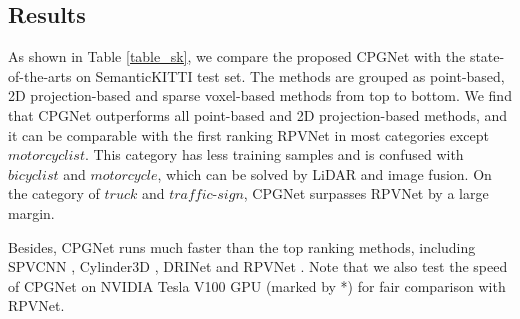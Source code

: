 \documentclass[letterpaper, 10 pt, conference]{ieeeconf}
\begin{document}
\subsection{Results}
As shown in Table \ref{table_sk}, we compare the proposed CPGNet with the state-of-the-arts on SemanticKITTI test set. The methods are grouped as point-based, 2D projection-based and sparse voxel-based methods from top to bottom. We find that CPGNet outperforms all point-based and 2D projection-based methods, and it can be comparable with the first ranking RPVNet \cite{xu2021rpvnet} in most categories except $motorcyclist$. This category has less training samples and is confused with $bicyclist$ and $motorcycle$, which can be solved by LiDAR and image fusion. On the category of $truck$ and $traffic$-$sign$, CPGNet surpasses RPVNet by a large margin.

Besides, CPGNet runs much faster than the top ranking methods, including SPVCNN \cite{tang2020searching}, Cylinder3D \cite{zhu2021cylindrical}, DRINet \cite{ye2021drinet} and RPVNet \cite{xu2021rpvnet}. Note that we also test the speed of CPGNet on NVIDIA Tesla V100 GPU (marked by *) for fair comparison with RPVNet.
\end{document}

